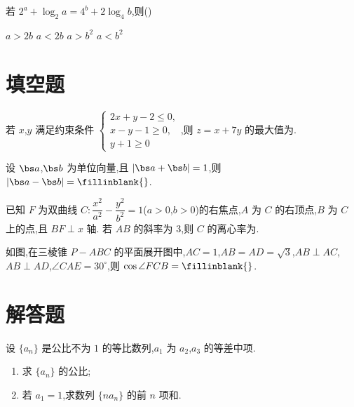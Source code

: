 \begin{problem}
若 \(2^a+\log_2 a=4^b+2\log_4 b\),则(\quad)

\choices
    {\(a>2b\)}
    {\(a<2b\)}
    {\(a>b^2\)}
    {\(a<b^2\)}

\end{problem}

\section{填空题}

\begin{problem}
若 \(x\),\(y\) 满足约束条件 \(\begin{cases}
2x+y-2\le 0,\\
x-y-1\ge 0,\\
y+1\ge 0
\end{cases}\),则 \(z=x+7y\) 的最大值为\fillinblank{}.

\end{problem}

\begin{problem}
设 \(\bs a\),\(\bs b\) 为单位向量,且 \(\left\lvert \bs a+\bs b \right\rvert=1\),则 \(\left\lvert \bs a-\bs b \right\rvert=\fillinblank{}\).

\end{problem}

\begin{problem}
已知 \(F\) 为双曲线 \(C:\dfrac{x^2}{a^2}-\dfrac{y^2}{b^2}=1\)(\(a>0\),\(b>0\))的右焦点,\(A\) 为 \(C\) 的右顶点,\(B\) 为 \(C\) 上的点,且 \(BF\perp x\) 轴. 若 \(AB\) 的斜率为 \(3\),则 \(C\) 的离心率为\fillinblank{}.

\end{problem}

\begin{problem}
如图,在三棱锥 \(P-ABC\) 的平面展开图中,\(AC=1\),\(AB=AD=\sqrt{3}\),\(AB\perp AC\),\(AB\perp AD\),\(\angle CAE=30^\circ\),则 \(\cos \angle FCB=\fillinblank{}\).


\end{problem}

\section{解答题}

\begin{problem}
设 \(\{a_n\}\) 是公比不为 \(1\) 的等比数列,\(a_1\) 为 \(a_2\),\(a_3\) 的等差中项.

\begin{enumerate}
\item 求 \(\{a_n\}\) 的公比;

\item 若 \(a_1=1\),求数列 \(\{na_n\}\) 的前 \(n\) 项和.
\end{enumerate}
\end{problem}

